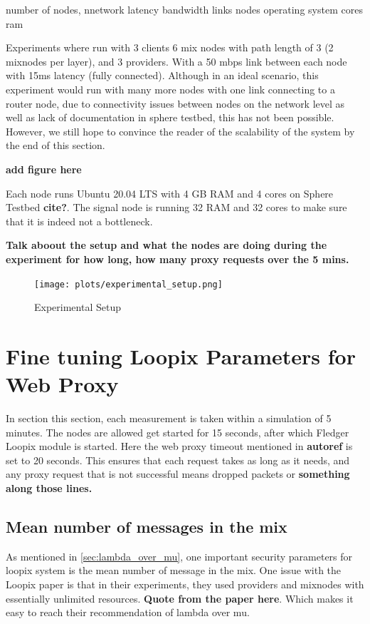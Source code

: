 \documentclass[a4paper,11pt,oneside]{report}
\begin{document}
number of nodes,
nnetwork latency bandwidth links
nodes operating system cores ram

Experiments where run with 3 clients 6 mix nodes with path length of 3 (2 mixnodes per layer), and 3 providers. With a 50 mbps link between each node with 15ms latency (fully connected). Although in an ideal scenario, this experiment would run with many more nodes with one link connecting to a router node, due to connectivity issues between nodes on the network level as well as lack of documentation in sphere testbed, this has not been possible. However, we still hope to convince the reader of the scalability of the system by the end of this section. 

\textbf{add figure here}

Each node runs Ubuntu 20.04 LTS with 4 GB RAM and 4 cores on Sphere Testbed \textbf{cite?}. The signal node is running 32 RAM and 32 cores to make sure that it is indeed not a bottleneck.


\textbf{Talk aboout the setup and what the nodes are doing during the experiment for how long, how many proxy requests over the 5 mins.}
\begin{figure}[H]
    \centering
    \texttt{[image: plots/experimental\_setup.png]}
    \caption{Experimental Setup}
    \label{fig:setup}
\end{figure}

\section{Fine tuning Loopix Parameters for Web Proxy}
\label{sec:finetune}
In section this section, each measurement is taken within a simulation of 5 minutes. The nodes are allowed get started for 15 seconds, after which Fledger Loopix module is started. Here the web proxy timeout mentioned in \textbf{autoref} is set to 20 seconds. This ensures that each request takes as long as it needs, and any proxy request that is not successful means dropped packets or \textbf{something along those lines.}
\subsection{Mean number of messages in the mix}
As mentioned in \autoref{sec:lambda_over_mu}, one important security parameters for loopix system is the mean number of message in the mix. One issue with the Loopix paper is that in their experiments, they used providers and mixnodes with essentially unlimited resources. \textbf{Quote from the paper here}. Which makes it easy to reach their recommendation of lambda over mu.
\end{document}
